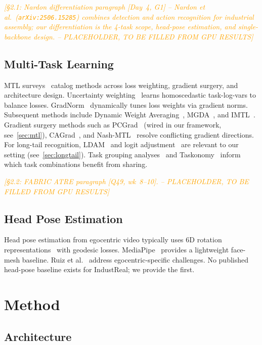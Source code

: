 \documentclass[conference]{IEEEtran}
\newcommand{\resultplaceholder}[1]{\textcolor{orange}{\emph{[#1 -- PLACEHOLDER, TO BE FILLED FROM GPU RESULTS]}}}
\begin{document}
\resultplaceholder{§2.1: Nardon differentiation paragraph [Day~4, G1] -- Nardon et al.~(\texttt{arXiv:2506.15285}) combines detection and action recognition for industrial assembly; our differentiation is the 4-task scope, head-pose estimation, and single-backbone design.}

\subsection{Multi-Task Learning}
MTL surveys~\cite{vandenhende2021mtl} catalog methods across loss weighting, gradient surgery, and architecture design. Uncertainty weighting~\cite{kendall2018multi} learns homoscedastic task-log-vars to balance losses. GradNorm~\cite{chen2018gradnorm} dynamically tunes loss weights via gradient norms. Subsequent methods include Dynamic Weight Averaging~\cite{liu2019dwa}, MGDA~\cite{sener2018mtl}, and IMTL~\cite{liu2021imtl}. Gradient surgery methods such as PCGrad~\cite{yu2020pcgrad} (wired in our framework, see~\cref{sec:mtl}), CAGrad~\cite{liu2021cagrad}, and Nash-MTL~\cite{navon2022nashmtl} resolve conflicting gradient directions. For long-tail recognition, LDAM~\cite{cao2019ldam} and logit adjustment~\cite{menon2021logit} are relevant to our setting (see~\cref{sec:longtail}). Task grouping analyses~\cite{standley2020tasks,fifty2021task} and Taskonomy~\cite{zamir2018taskonomy} inform which task combinations benefit from sharing.

\resultplaceholder{§2.2: FABRIC ATRE paragraph [Q49, wk~8--10].}

\subsection{Head Pose Estimation}
Head pose estimation from egocentric video typically uses 6D rotation representations~\cite{zhou2019continuity} with geodesic losses. MediaPipe~\cite{mediapipe} provides a lightweight face-mesh baseline. Ruiz et al.~\cite{ruiz2018zoominet} address egocentric-specific challenges. No published head-pose baseline exists for IndustReal; we provide the first.

\section{Method}
\label{sec:method}

\subsection{Architecture}
\label{sec:arch}
\end{document}
